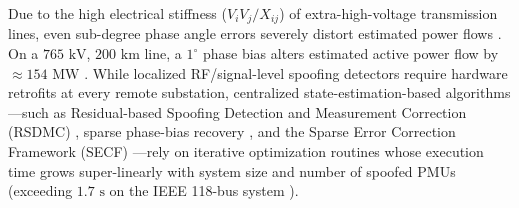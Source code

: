 \documentclass[journal,twoside]{IEEEtran}
\begin{document}
Due to the high electrical stiffness ($V_i V_j / X_{ij}$) of extra-high-voltage transmission lines, even sub-degree phase angle errors severely distort estimated power flows \cite{kundur1994power,badugu2026synchrophasor}. On a $765\text{~kV}$, $200\text{~km}$ line, a $1^\circ$ phase bias alters estimated active power flow by $\approx 154\text{~MW}$ \cite{kundur1994power}. While localized RF/signal-level spoofing detectors \cite{wei2022exploiting,bose2022gps} require hardware retrofits at every remote substation, centralized state-estimation-based algorithms---such as Residual-based Spoofing Detection and Measurement Correction (RSDMC) \cite{chauhan2021synchrophasor}, sparse phase-bias recovery \cite{fan2018synchrophasor,fan2018closed,zhang2020attack}, and the Sparse Error Correction Framework (SECF) \cite{desilva2021pmu}---rely on iterative optimization routines whose execution time grows super-linearly with system size and number of spoofed PMUs (exceeding $1.7\text{~s}$ on the IEEE 118-bus system \cite{desilva2021pmu,badugu2026synchrophasor}).
\end{document}
